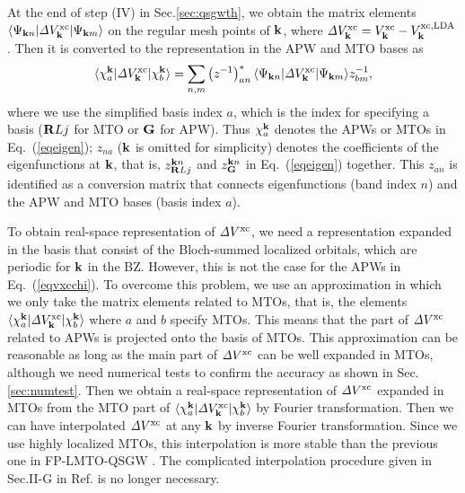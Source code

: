 \documentclass[a4paper,10pt,epsf,fleqn]{article}
\def\Psikn{\Psi_{{\bf k}n}}
\def\vxc{V^{\rm xc}}
\def\Dvxc{{\it \Delta} V^{\rm xc}}
\def\Psikn{{\Psi_{{\bf k}n}}}
\def\Psikm{{\Psi_{{\bf k}m}}}
\def\brl{{\bf R}L}
\newcommand{\bfk}{{\bf k}}
\newcommand{\bfG}{{\bf G}}
\newcommand{\req}[1]{\mbox{Eq.~(\ref{#1})}}
\begin{document}
At the end of step (IV) in Sec.\ref{sec:qsgwth}, we obtain the matrix elements
$\langle \Psikn | \Dvxc_\bfk | \Psikm \rangle$ on the regular mesh
points of $\bfk$, where
$\Dvxc_\bfk=\vxc_\bfk-V^{\rm xc,LDA}_\bfk$.
Then it is converted to the representation in the APW and MTO bases as
\begin{eqnarray}
\langle \chi^{\bfk}_a| \Dvxc_\bfk | \chi^{\bfk}_b \rangle
= \sum_{n,m} \left(z^{-1}\right)^*_{an}\langle \Psikn |\Dvxc_\bfk |
\Psikm \rangle z_{bm}^{-1}, \nonumber \\
\label{eqvxcchi}
\end{eqnarray}
where we use the simplified basis index $a$, which is the index for specifying a basis 
($\brl{j}$ for MTO or ${\bfG}$ for APW).
Thus $\chi^{\bfk}_a$ denotes the APWs or MTOs in \req{eqeigen};
$z_{na}$ ($\bfk$ is omitted for simplicity)
denotes the coefficients of the eigenfunctions at $\bfk$, that is,
$z^{{\bfk}n}_{\brl{j}}$ and $z^{\bfk n}_{\bfG}$ in \req{eqeigen} together.
This $z_{an}$ is identified as a conversion matrix that connects
eigenfunctions (band index $n$) and the APW and MTO bases (basis index $a$).

To obtain real-space representation of $\Dvxc$, we need a representation
expanded in the basis that consist of the Bloch-summed localized orbitals, 
which are periodic for $\bfk$ in the BZ. However, this is not the case for the APWs in
\req{eqvxcchi}. To overcome this problem, we use an approximation 
in which we only take the matrix elements 
related to MTOs, that is, the elements 
$\langle \chi^{\bfk}_a| \Dvxc_\bfk | \chi^{\bfk}_b \rangle$
where $a$ and $b$ specify MTOs.
This means that the part of $\Dvxc$ related to APWs is projected onto the basis of MTOs.
This approximation can be reasonable as long as the main part of $\Dvxc$ can be
well expanded in MTOs,
although we need numerical tests to confirm the accuracy as shown in Sec.\ref{sec:numtest}.
Then we obtain a real-space representation of 
$\Dvxc$ expanded in MTOs from the MTO part of 
$\langle \chi^{\bfk}_a| \Dvxc_\bfk | \chi^{\bfk}_b \rangle$ by Fourier transformation.
Then we can have interpolated $\Dvxc$ at any $\bfk$ by inverse Fourier transformation.
Since we use highly localized MTOs, 
this interpolation is more stable 
than the previous one in FP-LMTO-QSGW \cite{kotani_quasiparticle_2007}.
The complicated interpolation procedure 
given in Sec.II-G in Ref.\cite{kotani_quasiparticle_2007} is no
longer necessary.
\end{document}
